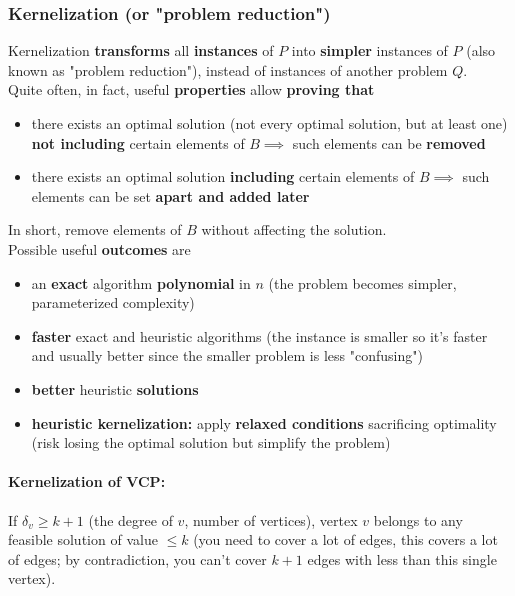 \newpage

\subsubsection{Kernelization (or "problem reduction")}
Kernelization \textbf{transforms} all \textbf{instances} of $P$ into \textbf{simpler} instances of $P$ (also known as "problem reduction"), instead of instances of another problem $Q$.\\

Quite often, in fact, useful \textbf{properties} allow \textbf{proving that}
\begin{itemize}
	\item there exists an optimal solution (not every optimal solution, but at least one) \textbf{not including} certain elements of $B \implies$ such elements can be \textbf{removed}
	\item there exists an optimal solution \textbf{including} certain elements of $B \implies$ such elements can be set \textbf{apart and added later}
\end{itemize}
In short, remove elements of $B$ without affecting the solution.\\

Possible useful \textbf{outcomes} are
\begin{itemize}
	\item an \textbf{exact} algorithm \textbf{polynomial} in $n$ (the problem becomes simpler, parameterized complexity)
	\item \textbf{faster} exact and heuristic algorithms (the instance is smaller so it's faster and usually better since the smaller problem is less "confusing")
	\item \textbf{better} heuristic \textbf{solutions}
	\item \textbf{heuristic kernelization:} apply \textbf{relaxed conditions} sacrificing optimality (risk losing the optimal solution but simplify the problem)
\end{itemize}

\newpage

\paragraph{Kernelization of VCP:} If $\delta_v \geq k+1$ (the degree of $v$, number of vertices), vertex $v$ belongs to any feasible solution of value $\leq k$ (you need to cover a lot of edges, this covers a lot of edges; by contradiction, you can't cover $k+1$ edges with less than this single vertex).\\

